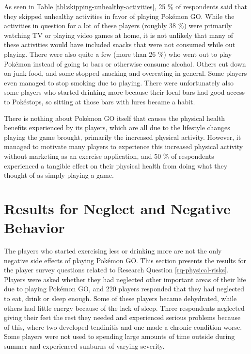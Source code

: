 As seen in Table \ref{tbl:skipping-unhealthy-activities}, 25 \% of respondents said that they skipped unhealthy activities in favor of playing Pokémon GO. While the activities in question for a lot of these players (roughly 38 \%) were primarily watching TV or playing video games at home, it is not unlikely that many of these activities would have included snacks that were not consumed while out playing. There were also quite a few (more than 26 \%) who went out to play Pokémon instead of going to bars or otherwise consume alcohol. Others cut down on junk food, and some stopped snacking and overeating in general. Some players even managed to stop smoking due to playing. There were unfortunately also some players who started drinking more because their local bars had good access to Pokéstops, so sitting at those bars with lures became a habit. 

There is nothing about Pokémon GO itself that causes the physical health benefits experienced by its players, which are all due to the lifestyle changes playing the game brought, primarily the increased physical activity. However, it managed to motivate many players to experience this increased physical activity without marketing as an exercise application, and 50 \% of respondents experienced a tangible effect on their physical health from doing what they thought of as simply playing a game. 


\section{Results for Neglect and Negative Behavior}

The players who started exercising less or drinking more are not the only negative side effects of playing Pokémon GO. This section presents the results for the player survey questions related to Research Question \ref{rq-physical-risks}. Players were asked whether they had neglected other important areas of their life due to playing Pokémon GO, and 220 players responded that they had neglected to eat, drink or sleep enough. Some of these players became dehydrated, while others had little energy because of the lack of sleep. Three respondents neglected giving their feet the rest they needed and experienced serious problems because of this, where two developed tendinitis and one made a chronic condition worse. Some players were not used to spending large amounts of time outside during summer and experienced sunburns of varying severity.

